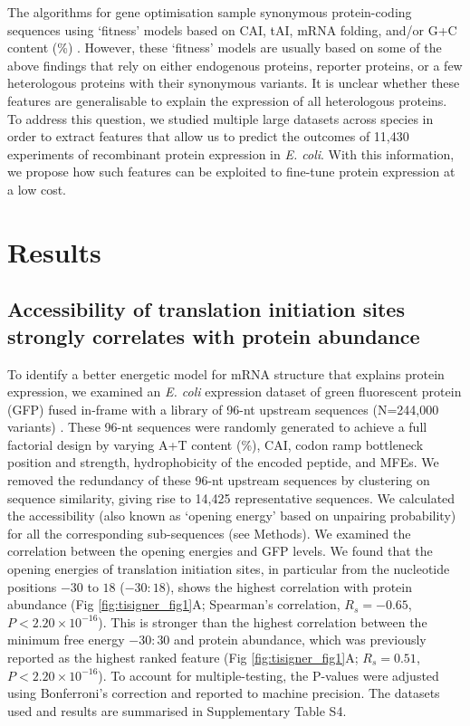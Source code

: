 The algorithms for gene optimisation sample synonymous protein-coding sequences using ‘fitness’ models based on CAI, tAI, mRNA folding, and/or G+C content (\%) \cite{Villalobos2006-nx,Salis2009-dh,Raab2010-eg,Chung2012-zh,Terai2016-vp}. However, these ‘fitness’ models are usually based on some of the above findings that rely on either endogenous proteins, reporter proteins, or a few heterologous proteins with their synonymous variants. It is unclear whether these features are generalisable to explain the expression of all heterologous proteins. To address this question, we studied multiple large datasets across species in order to extract features that allow us to predict the outcomes of 11,430 experiments of recombinant protein expression in \textit{E. coli}. With this information, we propose how such features can be exploited to fine-tune protein expression at a low cost.

\section{Results}
\subsection{Accessibility of translation initiation sites strongly correlates with protein abundance}
To identify a better energetic model for mRNA structure that explains protein expression, we examined an \textit{E. coli} expression dataset of green fluorescent protein (GFP) fused in-frame with a library of 96-nt upstream sequences (N=244,000 variants) \cite{Cambray2018-kn}. These 96-nt sequences were randomly generated to achieve a full factorial design by varying A+T content (\%), CAI, codon ramp bottleneck position and strength, hydrophobicity of the encoded peptide, and MFEs. We removed the redundancy of these 96-nt upstream sequences by clustering on sequence similarity, giving rise to 14,425 representative sequences. We calculated the accessibility (also known as ‘opening energy’ based on unpairing probability) for all the corresponding sub-sequences (see Methods). We examined the correlation between the opening energies and GFP levels. We found that the opening energies of translation initiation sites, in particular from the nucleotide positions $−30$ to $18$ ($−30:18$), shows the highest correlation with protein abundance (Fig \ref{fig:tisigner_fig1}A; Spearman’s correlation, $R_s = -0.65$, $P < 2.20 \times 10^{-16}$). This is stronger than the highest correlation between the minimum free energy $−30:30$ and protein abundance, which was previously reported as the highest ranked feature (Fig \ref{fig:tisigner_fig1}A; $R_s = 0.51$, $P < 2.20 \times 10^{-16}$). To account for multiple-testing, the P-values were adjusted using Bonferroni's correction and reported to machine precision. The datasets used and results are summarised in Supplementary Table S4.

